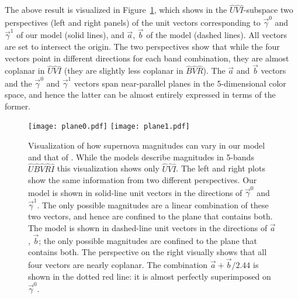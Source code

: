 \documentclass{aastex61}   	%
\begin{document}
The above result is visualized in Figure~\ref{plane:fig}, which  shows  in the
\color{red} ${\hat{U}}{\hat{V}}\hat{I}$-subspace \color{black}
two perspectives (left and right panels)
of the unit vectors corresponding to $\vec{\gamma}^0$ and  $\vec{\gamma}^1$ of our model (solid lines),
and $\vec{a}$, $\vec{b}$ of the  model (dashed lines).  All  vectors are set to intersect the origin.
The two perspectives show that while the four vectors point in different directions for each band combination,
they are almost coplanar in ${\hat{U}}{\hat{V}}{\hat{I}}$ (they are slightly less coplanar in ${\hat{B}}{\hat{V}}{\hat{R}}$).  The $\vec{a}$ and $\vec{b}$ vectors and the $\vec{\gamma}^0$ and $\vec{\gamma}^1$
vectors span near-parallel planes in the 5-dimensional color space, and hence the latter can be almost entirely expressed in terms of
the former.

\begin{figure}[htbp] %
   \centering
   \texttt{[image: plane0.pdf]}
   \texttt{[image: plane1.pdf]}
   \caption{
   Visualization of how supernova magnitudes can vary in our model and that of .  While the models describe
   magnitudes in 5-bands ${\hat{U}}{\hat{B}}{\hat{V}}{\hat{R}}{\hat{I}}$ this visualization shows only ${\hat{U}}{\hat{V}}{\hat{I}}$.   The left and right plots show the same information from
   two different perspectives.
   Our model is shown in solid-line unit vectors in the directions of $\vec{\gamma}^0$ and $\vec{\gamma}^1$. The only possible magnitudes
   are a linear combination of these two vectors, and hence are confined to the plane that contains both.
   The   model is shown in dashed-line unit vectors
   in the directions of  $\vec{a}$, $\vec{b}$; the only possible magnitudes are confined to the plane that contains both.
   The perspective on the right visually shows that all four vectors are nearly coplanar.  
   The combination $\vec{a}+\vec{b}/2.44$ is shown in the dotted red
   line: it is almost perfectly superimposed on $\vec{\gamma}^0$.
   \label{plane:fig}}
\end{figure}
\end{document}
